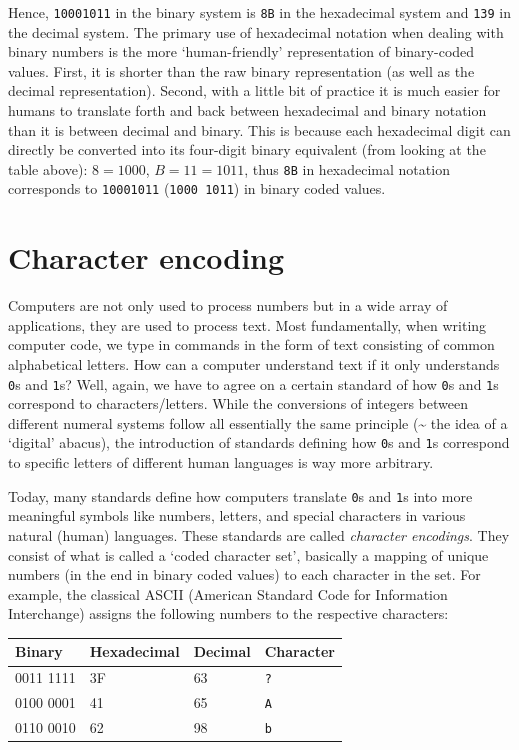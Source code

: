 \documentclass[
  12pt,
]{style/krantz}
\begin{document}
Hence, \texttt{10001011} in the binary system is \texttt{8B} in the hexadecimal system and \texttt{139} in the decimal system. The primary use of hexadecimal notation when dealing with binary numbers is the more `human-friendly' representation of binary-coded values. First, it is shorter than the raw binary representation (as well as the decimal representation). Second, with a little bit of practice it is much easier for humans to translate forth and back between hexadecimal and binary notation than it is between decimal and binary. This is because each hexadecimal digit can directly be converted into its four-digit binary equivalent (from looking at the table above): \(8=1000\), \(B=11=1011\), thus \texttt{8B} in hexadecimal notation corresponds to \texttt{10001011} (\texttt{1000\ 1011}) in binary coded values.

\hypertarget{character-encoding}{%
\section{Character encoding}\label{character-encoding}}

Computers are not only used to process numbers but in a wide array of applications, they are used to process text. Most fundamentally, when writing computer code, we type in commands in the form of text consisting of common alphabetical letters. How can a computer understand text if it only understands \texttt{0}s and \texttt{1}s? Well, again, we have to agree on a certain standard of how \texttt{0}s and \texttt{1}s correspond to characters/letters. While the conversions of integers between different numeral systems follow all essentially the same principle (\textasciitilde{} the idea of a `digital' abacus), the introduction of standards defining how \texttt{0}s and \texttt{1}s correspond to specific letters of different human languages is way more arbitrary.

Today, many standards define how computers translate \texttt{0}s and \texttt{1}s into more meaningful symbols like numbers, letters, and special characters in various natural (human) languages. These standards are called \emph{character encodings}. They consist of what is called a `coded character set', basically a mapping of unique numbers (in the end in binary coded values) to each character in the set. For example, the classical ASCII (American Standard Code for Information Interchange) assigns the following numbers to the respective characters:

\begin{longtable}[]{@{}llll@{}}
\toprule
Binary & Hexadecimal & Decimal & Character \\
\midrule
\endhead
0011 1111 & 3F & 63 & \texttt{?} \\
0100 0001 & 41 & 65 & \texttt{A} \\
0110 0010 & 62 & 98 & \texttt{b} \\
\bottomrule
\end{longtable}
\end{document}
